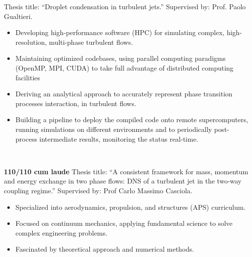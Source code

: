 






\iflongversion

	Thesis title: ``Droplet condensation in turbulent jets.'' Supervised by: Prof. Paolo Gualtieri. \\
	\smallskip
	\begin{itemize}
		\item Developing high-performance software (HPC) for simulating complex, high-resolution, multi-phase turbulent flows.
		\item Maintaining optimized codebases, using parallel computing paradigms (OpenMP, MPI, CUDA) to take full advantage of distributed computing facilities
		\item Deriving an analytical approach to accurately represent phase transition processes interaction, in turbulent flows.
		\item Building a pipeline to deploy the compiled code onto remote supercomputers, running simulations on different environments and to periodically post-process intermediate results, monitoring the status real-time.
	\end{itemize}
	\medskip
	\
	\medskip

	\textbf{110/110 cum laude} Thesis title: ``A consistent framework for mass, momentum and energy exchange in two phase flows: DNS of a turbulent jet in the two-way coupling regime.'' Supervised by: Prof Carlo Massimo Casciola. \\
	\smallskip
	\begin{itemize}
		\item Specialized into aerodynamics, propulsion, and structures (APS) curriculum.
		\item Focused on continuum mechanics, applying fundamental science to solve complex engineering problems.
		\item Fascinated by theoretical approach and numerical methods.
	\end{itemize}
	\medskip

